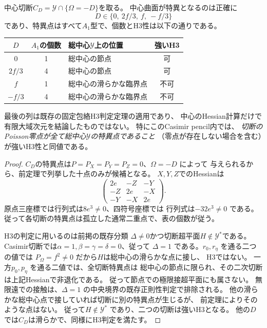 \begin{theorem}
\label{thm:casimir-four-values}
中心切断$C_D=\mathcal Y\cap\{\Omega=-D\}$を取る。
中心曲面が特異となるのは正確に
\[
 D\in\{0,\ 2f/3,\ f,\ -f/3\}
\]
であり、特異点はすべて$A_1$型で、個数とH3性は以下の通りである。
\begin{center}
\begin{tabular}{cclc}
\toprule
$D$&$A_1$の個数&総中心$\mathcal Y$上の位置&強いH3\\
\midrule
$0$&1&総中心の節点&可\\
$2f/3$&4&総中心の節点&可\\
$f$&1&総中心の滑らかな臨界点&不可\\
$-f/3$&4&総中心の滑らかな臨界点&不可\\
\bottomrule
\end{tabular}
\end{center}
最後の列は既存の固定包絡H3判定定理の適用であり、
中心のHessian計算だけで有限大域次元を結論したものではない。
特にこのCasimir pencil内では、
\emph{切断のPoisson零点が全て総中心$\mathcal Y$の特異点であること}
（零点が存在しない場合を含む）が強いH3性と同値である。
\end{theorem}
\begin{proof}
$C_D$の特異点は$P=P_X=P_Y=P_Z=0$、$\Omega=-D$ によって
与えられるから、前定理で列挙した十点のみが候補となる。
$X,Y,Z$でのHessianは
\[
 \begin{pmatrix}
 2e&-Z&-Y\\-Z&2e&-X\\-Y&-X&2e
 \end{pmatrix}.
\]
原点三座標では行列式は$8e^3\ne0$、四符号座標では
行列式は$-32e^3\ne0$ である。
従って各切断の特異点は孤立した通常二重点で、表の個数が従う。

H3の判定に用いるのは前掲の既存分類
$\Delta\ne0$かつ切断超平面$H\notin\mathcal Y^*$である。
Casimir切断では$\alpha=1,\beta=\gamma=\delta=0$、従って
$\Delta=1$ である。$r_0,r_\eta$ を通る二つの値では
$P_\Omega=f^2\ne0$ だから$H$は総中心の滑らかな点に接し、
H3ではない。
一方$p_0,p_\eta$ を通る二値では、全切断特異点は
総中心の節点に限られ、その二次切断は上記Hessianで非退化である。
従って節点での極限接超平面にも属さない。
無限遠での接触は、$\Delta=1$ の中央境界の既存正則性判定で排除される。
他の滑らかな総中心点で接していれば切断に別の特異点が生じるが、
前定理によりそのような点はない。
従って$H\notin\mathcal Y^*$ であり、二つの切断は強いH3となる。
他の$D$では$C_D$は滑らかで、同様にH3判定を満たす。
\end{proof}

